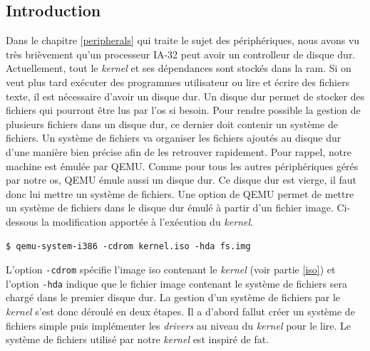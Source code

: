 \label{fs}

\subsection{Introduction}
Dans le chapitre \ref{peripherals} qui traite le sujet des périphériques, nous
avons vu très brièvement qu'un processeur \acrshort{IA-32} peut avoir un controlleur
de disque dur. Actuellement, tout le \textit{kernel} et ses dépendances sont
stockés dans la \acrshort{ram}. Si on veut plus tard exécuter des programmes utilisateur
ou lire et écrire des fichiers texte, il est nécessaire d'avoir un disque dur.
Un disque dur permet de stocker des fichiers qui pourront être lus par l'\acrshort{os}
si besoin. Pour rendre possible la gestion de plusieurs fichiers dans un disque
dur, ce dernier doit contenir un système de fichiers. Un système de fichiers va
organiser les fichiers ajoutés au disque dur d'une manière bien précise afin
de les retrouver rapidement. Pour rappel, notre machine est émulée par QEMU.
Comme pour tous les autres périphériques gérés par notre \acrshort{os}, QEMU
émule aussi un disque dur. Ce disque dur est vierge, il faut donc lui mettre
un système de fichiers. Une option de QEMU permet de mettre un système de fichiers
dans le disque dur émulé à partir d'un fichier image. Ci-dessous la modification
apportée à l'exécution du \textit{kernel}.

\begin{verbatim}
$ qemu-system-i386 -cdrom kernel.iso -hda fs.img
\end{verbatim}

L'option  \texttt{-cdrom} spécifie l'image \acrshort{iso} contenant
le \textit{kernel} (voir partie \ref{iso}) et l'option \texttt{-hda} indique
que le fichier image contenant le système de fichiers sera chargé dans le premier
disque dur. La gestion d'un système de fichiers par le \textit{kernel} s'est donc
déroulé en deux étapes. Il a d'abord fallut créer un système de fichiers simple
puis implémenter les \textit{drivers} au niveau du \textit{kernel} pour le lire.
Le système de fichiers utilisé par notre \textit{kernel} est inspiré de \acrshort{fat}. \\

